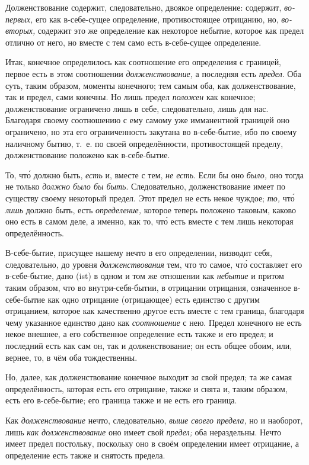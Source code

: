 Долженствование содержит, следовательно, двоякое определение: содержит,
{\em во-первых,} его как в-себе-сущее определение,
противостоящее отрицанию, но, {\em во-вторых,} содержит
это же определение как некоторое небытие, которое как предел отлично от
него, но вместе с тем само есть в-себе-сущее определение.

Итак, конечное определилось как соотношение его определения с границей,
первое есть в этом соотношении {\em долженствование,} а
последняя есть {\em предел}. Оба суть, таким образом,
моменты конечного; тем самым оба, как долженствование, так и предел, сами
конечны. Но лишь предел {\em положен} как конечное;
долженствование ограничено лишь в себе, следовательно, лишь для нас.
Благодаря своему соотношению с ему самому уже имманентной границей оно
ограничено, но эта его ограниченность закутана во в-себе-бытие, ибо по
своему наличному бытию, т.~е. по своей определённости, противостоящей
пределу, долженствование положено как в-себе-бытие.

То, чт\'{о} должно быть, {\em есть} и, вместе с тем,
{\em не есть}. Если бы оно {\em было,} оно тогда не только
{\em должно было бы быть}. Следовательно,
долженствование имеет по существу своему некоторый предел. Этот предел не
есть некое чуждое; {\em то,} чт\'{о} {\em лишь} должно быть, есть
{\em определение,} которое теперь положено таковым,
каково оно есть в самом деле, а именно, как то, чт\'{о} есть вместе с тем лишь
некоторая определённость.

В-себе-бытие, присущее нашему нечто в его определении, низводит себя,
следовательно, до уровня {\em долженствования} тем, что
то самое, чт\'{о} составляет его в-себе-бытие, дано (ist) в одном и том же
отношении как {\em небытие} и притом таким образом, что
во внутри-себя-бытии, в отрицании отрицания, означенное в-себе-бытие как
одно отрицание (отрицающее) есть единство с другим отрицанием, которое как
качественно другое есть вместе с тем граница, благодаря чему указанное
единство дано как {\em соотношение} с нею. Предел
конечного не есть некое внешнее, а его собственное определение есть также и
его предел; и последний есть как сам он, так и долженствование; он есть
общее обоим, или, вернее, то, в чём оба тождественны.

Но, далее, как долженствование конечное выходит {\em за}
свой предел; та же самая определённость, которая есть его отрицание, также
и снята и, таким образом, есть его в-себе-бытие; его граница также и не
есть его граница.

Как {\em долженствование} нечто, следовательно,
{\em выше своего предела,} но и наоборот, лишь
{\em как долженствование} оно имеет свой
{\em предел;} оба нераздельны. Нечто имеет предел
постольку, поскольку оно в своём определении имеет отрицание, а определение
есть также и снятость предела.

